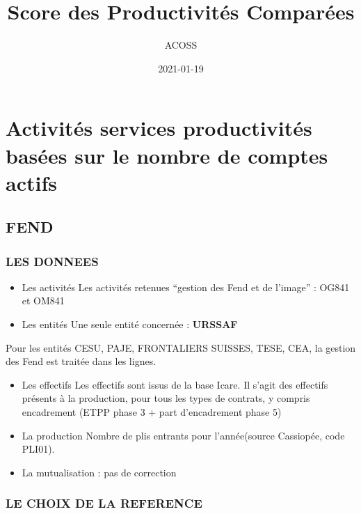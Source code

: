 \documentclass[
]{book}
\title{Score des Productivités Comparées}
\author{ACOSS}
\date{2021-01-19}
\begin{document}
\maketitle

{
\setcounter{tocdepth}{1}
\tableofcontents
}
\hypertarget{part-activituxe9s-services-productivituxe9s-basuxe9es-sur-le-nombre-de-comptes-actifs}{%
\part{Activités services productivités basées sur le nombre de comptes actifs}\label{part-activituxe9s-services-productivituxe9s-basuxe9es-sur-le-nombre-de-comptes-actifs}}

\hypertarget{fend}{%
\chapter{FEND}\label{fend}}

\hypertarget{les-donnees}{%
\section{LES DONNEES}\label{les-donnees}}

\begin{itemize}
\item
  Les activités
  Les activités retenues ``gestion des Fend et de l'image'' : OG841 et OM841
\item
  Les entités
  Une seule entité concernée : \textbf{URSSAF}
\end{itemize}

Pour les entités CESU, PAJE, FRONTALIERS SUISSES, TESE, CEA, la gestion des Fend est traitée dans les lignes.

\begin{itemize}
\item
  Les effectifs
  Les effectifs sont issus de la base Icare.
  Il s'agit des effectifs présents à la production, pour tous les types de contrats, y compris encadrement (ETPP phase 3 + part d'encadrement phase 5)
\item
  La production
  Nombre de plis entrants pour l'année(source Cassiopée, code PLI01).
\item
  La mutualisation : pas de correction
\end{itemize}

\hypertarget{le-choix-de-la-reference}{%
\section{LE CHOIX DE LA REFERENCE}\label{le-choix-de-la-reference}}
\end{document}
